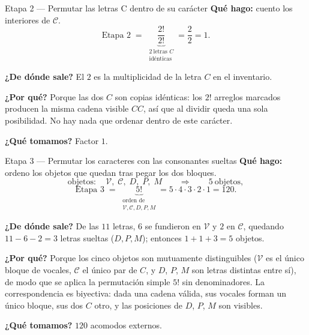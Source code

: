 \documentclass[11pt]{article}
\begin{document}
\begin{paso}{Etapa 2 --- Permutar las letras C dentro de su car\'acter}
\textbf{Qu\'e hago:} cuento los interiores de $\mathcal{C}$.
\[
\text{Etapa 2}\;=\;\underbrace{\frac{2!}{2!}}_{\substack{2\ \text{letras }C\\ \text{id\'enticas}}}=\frac{2}{2}=1 .
\]

\textbf{¿De d\'onde sale?} El $2$ es la multiplicidad de la letra $C$ en el inventario.

\textbf{¿Por qu\'e?} Porque las dos $C$ son copias id\'enticas: los $2!$ arreglos marcados producen la misma
cadena visible $CC$, as\'i que al dividir queda una sola posibilidad. No hay nada que ordenar dentro de este
car\'acter.

\textbf{¿Qu\'e tomamos?} Factor $1$.
\end{paso}

\begin{paso}{Etapa 3 --- Permutar los caracteres con las consonantes sueltas}
\textbf{Qu\'e hago:} ordeno los objetos que quedan tras pegar los dos bloques.
\[
\text{objetos}:\quad \mathcal{V},\;\mathcal{C},\;D,\;P,\;M \qquad\Longrightarrow\qquad 5\ \text{objetos},
\]
\[
\text{Etapa 3}\;=\;\underbrace{5!}_{\substack{\text{orden de}\\ \mathcal{V},\mathcal{C},D,P,M}}
=5\cdot4\cdot3\cdot2\cdot1=120 .
\]

\textbf{¿De d\'onde sale?} De las $11$ letras, $6$ se fundieron en $\mathcal{V}$ y $2$ en $\mathcal{C}$,
quedando $11-6-2=3$ letras sueltas ($D,P,M$); entonces $1+1+3=5$ objetos.

\textbf{¿Por qu\'e?} Porque los cinco objetos son mutuamente distinguibles ($\mathcal{V}$ es el \'unico
bloque de vocales, $\mathcal{C}$ el \'unico par de $C$, y $D$, $P$, $M$ son letras distintas entre s\'i), de
modo que se aplica la permutaci\'on simple $5!$ sin denominadores. La correspondencia es biyectiva: dada una
cadena v\'alida, sus vocales forman un \'unico bloque, sus dos $C$ otro, y las posiciones de $D$, $P$, $M$
son visibles.

\textbf{¿Qu\'e tomamos?} $120$ acomodos externos.
\end{paso}
\end{document}
